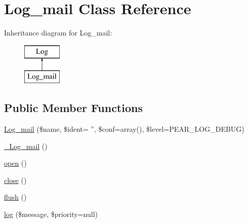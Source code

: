 \hypertarget{class_log__mail}{
\section{Log\_\-mail Class Reference}
\label{class_log__mail}
}
Inheritance diagram for Log\_\-mail:\begin{figure}[H]
\begin{center}
\leavevmode
\includegraphics[height=2.000000cm]{class_log__mail}
\end{center}
\end{figure}
\subsection*{Public Member Functions}
\begin{DoxyCompactItemize}
\item 
\hyperlink{class_log__mail_af7ca99af8a3c65d4538d60a01a68250a}{Log\_\-mail} (\$name, \$ident= '', \$conf=array(), \$level=PEAR\_\-LOG\_\-DEBUG)
\item 
\hyperlink{class_log__mail_a4c8d610aaf28c24a6c0308bdb3e40593}{\_\-Log\_\-mail} ()
\item 
\hyperlink{class_log__mail_a44a2ac59a3b91f8c18905dce700934d6}{open} ()
\item 
\hyperlink{class_log__mail_aa69c8bf1f1dcf4e72552efff1fe3e87e}{close} ()
\item 
\hyperlink{class_log__mail_a7751f77b5263bcf940ece6e824a05b38}{flush} ()
\item 
\hyperlink{class_log__mail_ac3758dfa38a67df158a446847cf06413}{log} (\$message, \$priority=null)
\end{DoxyCompactItemize}
